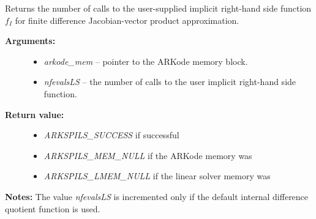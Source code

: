 \documentclass[letterpaper,10pt,english]{sphinxmanual}
\begin{document}
\begin{fulllineitems}
\label{c_interface/User_callable:ARKSpilsGetNumRhsEvals}
Returns the number of calls to the user-supplied implicit
right-hand side function $f_I$ for finite difference
Jacobian-vector product approximation.
\begin{description}
\item[{\textbf{Arguments:}}] \leavevmode\begin{itemize}
\item {} 
\emph{arkode\_mem} -- pointer to the ARKode memory block.

\item {} 
\emph{nfevalsLS} -- the number of calls to the user implicit
right-hand side function.

\end{itemize}

\item[{\textbf{Return value:}}] \leavevmode\begin{itemize}
\item {} 
\emph{ARKSPILS\_SUCCESS} if successful

\item {} 
\emph{ARKSPILS\_MEM\_NULL} if the ARKode memory was 

\item {} 
\emph{ARKSPILS\_LMEM\_NULL} if the linear solver memory was 

\end{itemize}

\end{description}

\textbf{Notes:} The value \emph{nfevalsLS} is incremented only if the default
internal difference quotient function is used.

\end{fulllineitems}

\end{document}
